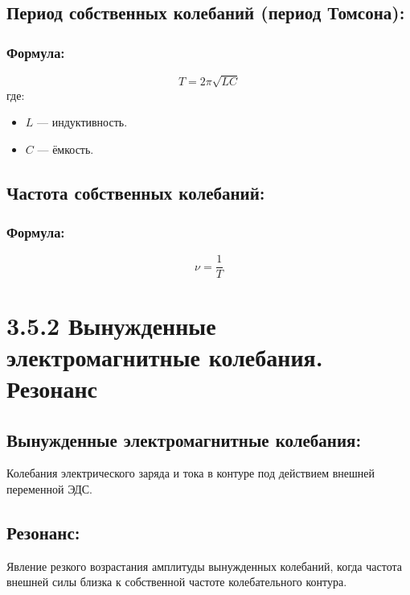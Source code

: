 \documentclass[a4paper,12pt]{article}
\begin{document}
\vspace{-9pt}
\subsection*{Период собственных колебаний (период Томсона):}
\vspace{-3pt}

\subsubsection*{Формула:}
\vspace{-0.05em}
$$ T = 2\pi \sqrt{LC} $$
где:
\begin{itemize}
    \item $L$ — индуктивность.
    \item $C$ — ёмкость.
\end{itemize}


\vspace{-9pt}
\subsection*{Частота собственных колебаний:}
\vspace{-3pt}
\subsubsection*{Формула:}
\vspace{-0.05em}
$$ \nu = \frac{1}{T} $$


\section*{3.5.2 Вынужденные электромагнитные колебания. Резонанс}
\vspace{-9pt}
\subsection*{Вынужденные электромагнитные колебания:}
\vspace{-3pt}
Колебания электрического заряда и тока в контуре под действием внешней переменной ЭДС.

\vspace{-9pt}
\subsection*{Резонанс:}
\vspace{-3pt}
Явление резкого возрастания амплитуды вынужденных колебаний, когда частота внешней силы близка к собственной частоте колебательного контура.
\end{document}

